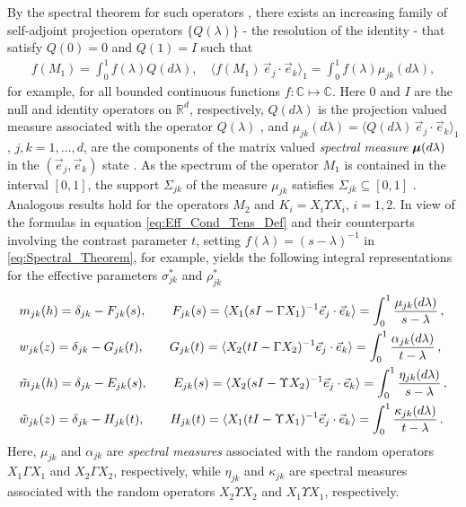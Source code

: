 \documentclass[11pt]{amsart}
\newcommand\bmu{\mbox{\boldmath${\mu}$}}
\begin{document}
By the spectral theorem for such
operators \cite{Reed-1980,Stone:64}, there exists an increasing family
of self-adjoint projection operators $\{Q(\lambda)\}$ - the resolution of the
identity - that satisfy $Q(0)=0$ and $Q(1)=I$ such that 
% 
\begin{align}\label{eq:Spectral_Theorem}
  f(M_1)=\int_0^1 f(\lambda)Q(d\lambda), \quad
  \langle f(M_1)\,\vec{e}_j\cdot\vec{e}_k\rangle_1= \int_0^1f(\lambda)\mu_{jk}(d\lambda), 
\end{align}
%
for example, for all bounded continuous functions
$f:\mathbb{C}\mapsto\mathbb{C}$. Here 
$0$ and $I$ are the null and identity operators on $\mathbb{R}^d$,
respectively, $Q(d\lambda)$ is the projection valued measure associated with 
the operator $Q(\lambda)$ \cite{Reed-1980}, and
$\mu_{jk}(d\lambda)=\langle Q(d\lambda)\,\vec{e}_j\cdot\vec{e}_k\rangle_1$, $j,k=1,\ldots,d$, are the
components of the matrix valued \emph{spectral measure} $\bmu(d\lambda)$ in
the $(\vec{e}_j,\vec{e}_k)$ state
\cite{Golden:CMP-473,Reed-1980,Stone:64}. As the spectrum of the
operator $M_1$ is contained in the interval $[0,1]$, the support
$\Sigma_{jk}$ of the measure $\mu_{jk}$ satisfies $\Sigma_{jk}\subseteq[0,1]$
\cite{Reed-1980}. Analogous results hold for the operators
$M_2$ and $K_i=X_i\Upsilon X_i$, $i=1,2$. In view of the formulas in equation
\eqref{eq:Eff_Cond_Tens_Def} and their counterparts involving the
contrast parameter $t$, setting $f(\lambda)=(s-\lambda)^{-1}$ in
\eqref{eq:Spectral_Theorem}, for example, yields the following
integral representations  
for the effective parameters $\sigma^*_{jk}$ and $\rho^*_{jk}$ 
%
\begin{align}\label{eq:Stieltjes_F}
  &m_{jk}(h)=\delta_{jk}-F_{jk}(s), \qquad
  F_{jk}(s)=\langle X_1(sI-\Gamma X_1)^{-1}\vec{e}_j\cdot\vec{e}_k\rangle=\int_0^1\frac{\mu_{jk}(d\lambda)}{s-\lambda}\,,
  \\
  &w_{jk}(z)=\delta_{jk}-G_{jk}(t), \qquad
  G_{jk}(t)=\langle X_2(tI-\Gamma X_2)^{-1}\vec{e}_j\cdot\vec{e}_k\rangle=\int_0^1\frac{\alpha_{jk}(d\lambda)}{t-\lambda}\,,
  \notag \\
  &\tilde{m}_{jk}(h)=\delta_{jk}-E_{jk}(s), \qquad
  E_{jk}(s)=\langle X_2(sI-\Upsilon X_2)^{-1}\vec{e}_j\cdot\vec{e}_k\rangle=\int_0^1\frac{\eta_{jk}(d\lambda)}{s-\lambda}\,,
  \notag \\
  &\tilde{w}_{jk}(z)=\delta_{jk}-H_{jk}(t), \qquad
  H_{jk}(t)=\langle X_1(tI-\Upsilon X_1)^{-1}\vec{e}_j\cdot\vec{e}_k\rangle=\int_0^1\frac{\kappa_{jk}(d\lambda)}{t-\lambda}\,.
  \notag
\end{align}
%
Here, $\mu_{jk}$ and $\alpha_{jk}$ are \emph{spectral measures} associated
with the random operators $X_1\Gamma X_1$ and $X_2\Gamma X_2$, respectively, while
$\eta_{jk}$ and $\kappa_{jk}$ are spectral measures associated
with the random operators $X_2\Upsilon X_2$ and $X_1\Upsilon X_1$, respectively. 
\end{document}
